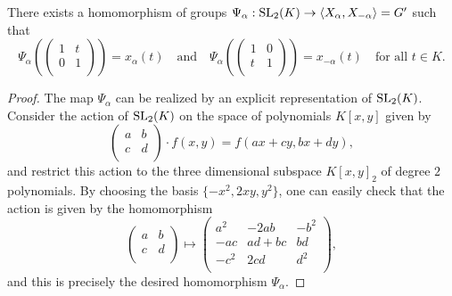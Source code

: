 \begin{proposition}
    There exists a homomorphism of groups 
    $\Psi_\alpha:\mathrm{SL}_2(K)\rightarrow\langle X_\alpha,X_{-\alpha}\rangle=G'$
    such that 
    $$\Psi_\alpha\left(\begin{pmatrix}
        1 & t\\
        0 & 1\\
    \end{pmatrix}\right)=x_\alpha(t)\quad\text{and}\quad\Psi_\alpha\left(\begin{pmatrix}
        1 & 0\\
        t & 1\\
    \end{pmatrix}\right)=x_{-\alpha}(t)\quad\text{for all $t\in K$}.$$
\end{proposition}
\begin{proof}
    The map $\Psi_\alpha$ can be realized by an explicit representation of $\mathrm{SL}_2(K)$. Consider the action of $\mathrm{SL}_2(K)$ on the space of polynomials $K[x,y]$ given by 
    $$\begin{pmatrix}
        a & b\\
        c & d\\
    \end{pmatrix}\cdot f(x,y)=f(ax+cy,bx+dy),$$
    and restrict this action to the three dimensional subspace $K[x,y]_2$ of degree $2$ polynomials. By choosing the basis $\{-x^2,2xy,y^2\}$, one can easily check that the action is given by the homomorphism
    $$\begin{pmatrix}
        a& b\\
        c&d\\
    \end{pmatrix}\longmapsto\begin{pmatrix}
        a^2 & -2ab & -b^2\\
        -ac & ad+bc & bd\\
        -c^2 & 2cd & d^2\\
    \end{pmatrix},$$
    and this is precisely the desired homomorphism $\Psi_\alpha$.
\end{proof}


